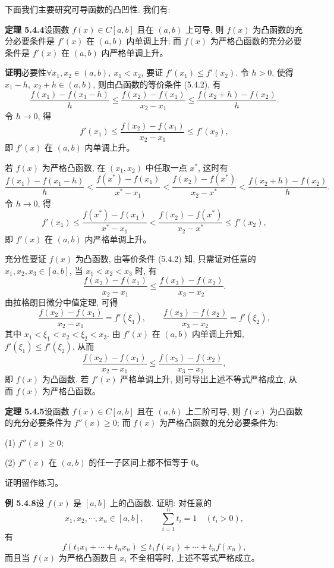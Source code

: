 \documentclass[UTF8, 12pt, fontset=fandol, oneside]{ctexart}
\begin{document}
下面我们主要研究可导函数的凸凹性. 我们有:

\noindent\textbf{定理 5.4.4}\quad 设函数 $f(x)\in C[a,b]$ 且在 $(a,b)$ 上可导, 则 $f(x)$ 为凸函数的充分必要条件是 $f'(x)$ 在 $(a,b)$ 内单调上升; 而 $f(x)$ 为严格凸函数的充分必要条件是 $f'(x)$ 在 $(a,b)$ 内严格单调上升。

\noindent\textbf{证明}\quad 必要性\quad $\forall x_1,x_2\in(a,b),\ x_1<x_2$, 要证 $f'(x_1)\leqslant f'(x_2)$. 令 $h>0$, 使得 $x_1-h,\ x_2+h\in(a,b)$, 则由凸函数的等价条件 (5.4.2), 有
\[
  \frac{f(x_1)-f(x_1-h)}{h}
  \leqslant
  \frac{f(x_2)-f(x_1)}{x_2-x_1}
  \leqslant
  \frac{f(x_2+h)-f(x_2)}{h}.
\]
令 $h\to0$, 得
\[
  f'(x_1)\leqslant\frac{f(x_2)-f(x_1)}{x_2-x_1}\leqslant f'(x_2),
\]
即 $f'(x)$ 在 $(a,b)$ 内单调上升。

若 $f(x)$ 为严格凸函数, 在 $(x_1,x_2)$ 中任取一点 $x^*$, 这时有
\[
  \frac{f(x_1)-f(x_1-h)}{h}
  <
  \frac{f(x^*)-f(x_1)}{x^*-x_1}
  <
  \frac{f(x_2)-f(x^*)}{x_2-x^*}
  <
  \frac{f(x_2+h)-f(x_2)}{h}.
\]
令 $h\to0$, 得
\[
  f'(x_1)\leqslant
  \frac{f(x^*)-f(x_1)}{x^*-x_1}
  <
  \frac{f(x_2)-f(x^*)}{x_2-x^*}
  \leqslant f'(x_2),
\]
即 $f'(x)$ 在 $(a,b)$ 内严格单调上升。

充分性\quad 要证 $f(x)$ 为凸函数, 由等价条件 (5.4.2) 知, 只需证对任意的 $x_1,x_2,x_3\in[a,b]$, 当 $x_1<x_2<x_3$ 时, 有
\[
  \frac{f(x_2)-f(x_1)}{x_2-x_1}
  \leqslant
  \frac{f(x_3)-f(x_2)}{x_3-x_2}.
\]
由拉格朗日微分中值定理, 可得
\[
  \frac{f(x_2)-f(x_1)}{x_2-x_1}=f'(\xi_1),\qquad
  \frac{f(x_3)-f(x_2)}{x_3-x_2}=f'(\xi_2),
\]
其中 $x_1<\xi_1<x_2<\xi_2<x_3$. 由 $f'(x)$ 在 $(a,b)$ 内单调上升知, $f'(\xi_1)\leqslant f'(\xi_2)$, 从而
\[
  \frac{f(x_2)-f(x_1)}{x_2-x_1}
  \leqslant
  \frac{f(x_3)-f(x_2)}{x_3-x_2},
\]
即 $f(x)$ 为凸函数. 若 $f'(x)$ 严格单调上升, 则可导出上述不等式严格成立, 从而 $f(x)$ 为严格凸函数。

\noindent\textbf{定理 5.4.5}\quad 设函数 $f(x)\in C[a,b]$ 且在 $(a,b)$ 上二阶可导, 则 $f(x)$ 为凸函数的充分必要条件为 $f''(x)\geqslant0$; 而 $f(x)$ 为严格凸函数的充分必要条件为:

(1) $f''(x)\geqslant0$;

(2) $f''(x)$ 在 $(a,b)$ 的任一子区间上都不恒等于 $0$。

证明留作练习。

\noindent\textbf{例 5.4.8}\quad 设 $f(x)$ 是 $[a,b]$ 上的凸函数. 证明: 对任意的
\[
  x_1,x_2,\cdots,x_n\in[a,b],\qquad
  \sum_{i=1}^n t_i=1\quad (t_i>0),
\]
有
\[
  f(t_1x_1+\cdots+t_nx_n)\leqslant t_1f(x_1)+\cdots+t_nf(x_n),
\]
而且当 $f(x)$ 为严格凸函数且 $x_i$ 不全相等时, 上述不等式严格成立。
\end{document}
